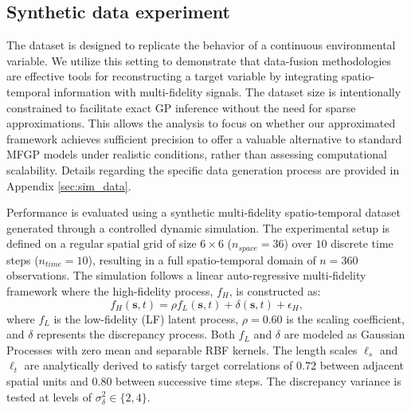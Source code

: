 \documentclass[12pt]{article}
\begin{document}
 \subsection{Synthetic data experiment} \label{Synthetic_data_exp}
The dataset is designed to replicate the behavior of a continuous environmental variable. We utilize this setting to demonstrate that data-fusion methodologies are effective tools for reconstructing a target variable by integrating spatio-temporal information with multi-fidelity signals. The dataset size is intentionally constrained to facilitate exact GP inference without the need for sparse approximations. This allows the analysis to focus on whether our approximated framework achieves sufficient precision to offer a valuable alternative to standard MFGP models under realistic conditions, rather than assessing computational scalability. Details regarding the specific data generation process are provided in Appendix \ref{sec:sim_data}.


\noindent
\hangindent=-5mm
Performance is evaluated using a synthetic multi-fidelity spatio-temporal dataset generated through a controlled dynamic simulation. The experimental setup is defined on a regular spatial grid of size $6 \times 6$ ($n_{space} = 36$) over $10$ discrete time steps ($n_{time} = 10$), resulting in a full spatio-temporal domain of $n = 360$ observations. The simulation follows a linear auto-regressive multi-fidelity framework where the high-fidelity  process, $f_H$, is constructed as:
\begin{equation}
    f_H(\bm{s}, t) = \rho f_L(\bm{s}, t) + \delta(\bm{s}, t) + \epsilon_H,
\end{equation}
where $f_L$ is the low-fidelity (LF) latent process, $\rho = 0.60$ is the scaling coefficient, and $\delta$ represents the discrepancy process. Both $f_L$ and $\delta$ are modeled as Gaussian Processes with zero mean and separable  RBF kernels. The length scales $\ell_s$ and $\ell_t$ are analytically derived to satisfy target correlations of $0.72$ between adjacent spatial units and $0.80$ between successive time steps. The discrepancy variance is tested at levels of $\sigma_{\delta}^2 \in \{2, 4\}$.
\end{document}
